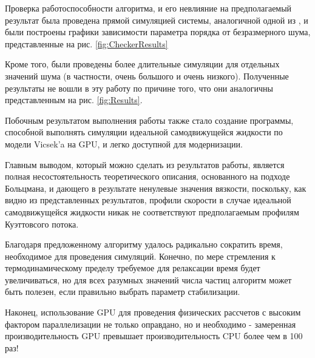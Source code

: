 Проверка работоспособности алгоритма, и его невлияние на предполагаемый результат была проведена прямой симуляцией системы, аналогичной одной из \cite{vicsek1995}, и были построены графики зависимости параметра порядка от безразмерного шума, представленные на рис. \ref{fig:CheckerResults}

Кроме того, были проведены более длительные симуляции для отдельных значений шума (в частности, очень большого и очень низкого). Полученные результаты не вошли в эту работу по причине того, что они аналогичны представленным на рис. \ref{fig:Results}.

Побочным результатом выполнения работы также стало создание программы, способной выполнять симуляции идеальной самодвижущейся жидкости по модели Vicsek'a на GPU, и легко доступной для модернизации.

\label{ch:Conclusion}
Главным выводом, который можно сделать из результатов работы, является полная несостоятельность теоретического описания, основанного на подходе Больцмана, и дающего в результате ненулевые значения вязкости, поскольку, как видно из представленных результатов, профили скорости в случае идеальной самодвижущейся жидкости никак не соответствуют предполагаемым профилям Куэттовсого потока.

Благодаря предложенному алгоритму удалось радикально сократить время, необходимое для проведения симуляций. Конечно, по мере стремления к термодинамическому пределу требуемое для релаксации время будет увеличиваться, но для всех разумных значений числа частиц алгоритм может быть полезен, если правильно выбрать параметр стабилизации.

Наконец, использование GPU для проведения физических рассчетов с высоким фактором параллелизации не только оправдано, но и необходимо - замеренная производительность GPU превышает производительность CPU более чем в 100 раз!